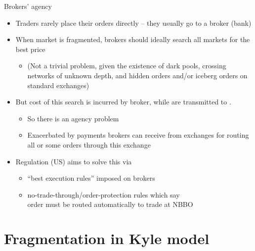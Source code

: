 \documentclass[english,10pt
,aspectratio=169
]{beamer}
\begin{document}
\begin{frame}{Brokers' agency}
	\begin{itemize}
		\item Traders rarely place their orders directly -- they usually go to a broker (bank)
		\item When market is fragmented, brokers should ideally search all markets for the best price
		\begin{itemize}
			\item (Not a trivial problem, given the existence of dark pools, crossing networks of unknown depth, and hidden orders and/or iceberg orders on standard exchanges)
		\end{itemize}
		\pause
		\item But \alert{cost} of this search is incurred by \alert{broker}, while  are transmitted to .
		\begin{itemize}
			\item So there is an agency problem
			\item Exacerbated by payments brokers can receive from exchanges for routing all or some orders through this exchange
		\end{itemize}
		\pause
		\item Regulation (US) aims to solve this via
		\begin{itemize}
			\item ``best execution rules'' imposed on brokers
			\item no-trade-through/order-protection rules which say \\
			order must be routed automatically to trade at NBBO
		\end{itemize}
	\end{itemize}
\end{frame}



\section{Fragmentation in Kyle model}
\end{document}
